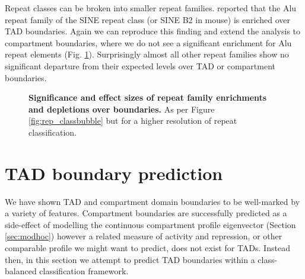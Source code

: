 \documentclass[a4paper,11pt,oneside]{book}
\begin{document}
Repeat classes can be broken into smaller repeat families. \citet{Dixon2012} reported that the Alu repeat family of the SINE repeat class (or SINE B2 in mouse) is enriched over TAD boundaries. Again we can reproduce this finding and extend the analysis to compartment boundaries, where we do not see a significant enrichment for Alu repeat elements (Fig. \ref{fig:rep_fambubble}). Surprisingly almost all other repeat families show no significant departure from their expected levels over TAD or compartment boundaries.

\begin{figure}
\begin{center} 
\captionsetup{width=\textwidth}
\caption[Significance and effect sizes of repeat family enrichments and depletions over boundaries.]{ {\bf Significance and effect sizes of repeat family enrichments and depletions over boundaries.}
As per Figure \ref{fig:rep_classbubble} but for a higher resolution of repeat classification.
}\label{fig:rep_fambubble}
\end{center}
\end{figure} 


\section{TAD boundary prediction}\label{sec:boundarypred}

We have shown TAD and compartment domain boundaries to be well-marked by a variety of features. Compartment boundaries are successfully predicted as a side-effect of modelling the continuous compartment profile eigenvector (Section \ref{sec:modhoc}) however a related measure of activity and repression, or other comparable profile we might want to predict, does not exist for TADs. Instead then, in this section we attempt to predict TAD boundaries within a class-balanced classification framework.
\end{document}
